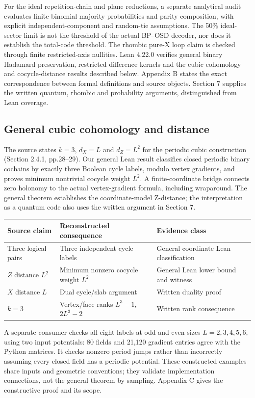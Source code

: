 For the ideal repetition-chain and plane reductions, a separate analytical audit evaluates finite binomial majority probabilities and parity composition, with explicit independent-component and random-tie assumptions. The 50\% ideal-sector limit is not the threshold of the actual BP--OSD decoder, nor does it establish the total-code threshold. The rhombic pure-X loop claim is checked through finite restricted-axis nullities. Lean 4.22.0 verifies general binary Hadamard preservation, restricted difference kernels and the cubic cohomology and cocycle-distance results described below. Appendix B states the exact correspondence between formal definitions and source objects. Section 7 supplies the written quantum, rhombic and probability arguments, distinguished from Lean coverage.

\subsection{General cubic cohomology and distance}
The source states $k=3$, $d_X=L$ and $d_Z=L^2$ for the periodic cubic construction (Section 2.4.1, pp.28--29). Our general Lean result classifies closed periodic binary cochains by exactly three Boolean cycle labels, modulo vertex gradients, and proves minimum nontrivial cocycle weight $L^2$. A finite-coordinate bridge connects zero holonomy to the actual vertex-gradient formula, including wraparound. The general theorem establishes the coordinate-model Z-distance; the interpretation as a quantum code also uses the written argument in Section 7.
\begin{center}\begin{tabular}{p{.18\linewidth}p{.32\linewidth}p{.38\linewidth}}
\toprule Source claim & Reconstructed consequence & Evidence class\\\midrule
Three logical pairs & Three independent cycle labels & General coordinate Lean classification\\
$Z$ distance $L^2$ & Minimum nonzero cocycle weight $L^2$ & General Lean lower bound and witness\\
$X$ distance $L$ & Dual cycle/slab argument & Written duality proof\\
$k=3$ & Vertex/face ranks $L^3-1$, $2L^3-2$ & Written rank consequence\\
\bottomrule\end{tabular}\end{center}
A separate consumer checks all eight labels at odd and even sizes $L=2,3,4,5,6$, using two input potentials: 80 fields and 21,120 gradient entries agree with the Python matrices. It checks nonzero period jumps rather than incorrectly assuming every closed field has a periodic potential. These constructed examples share inputs and geometric conventions; they validate implementation connections, not the general theorem by sampling. Appendix C gives the constructive proof and its scope.

